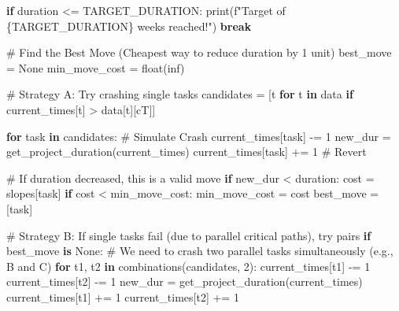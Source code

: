 \documentclass[
  letterpaper,
  DIV=11,
  numbers=noendperiod]{scrreprt}
\newenvironment{Shaded}{\begin{snugshade}}{\end{snugshade}}
\newcommand{\BuiltInTok}[1]{\textcolor[rgb]{0.00,0.23,0.31}{#1}}
\newcommand{\CommentTok}[1]{\textcolor[rgb]{0.37,0.37,0.37}{#1}}
\newcommand{\ControlFlowTok}[1]{\textcolor[rgb]{0.00,0.23,0.31}{\textbf{#1}}}
\newcommand{\DecValTok}[1]{\textcolor[rgb]{0.68,0.00,0.00}{#1}}
\newcommand{\KeywordTok}[1]{\textcolor[rgb]{0.00,0.23,0.31}{\textbf{#1}}}
\newcommand{\NormalTok}[1]{\textcolor[rgb]{0.00,0.23,0.31}{#1}}
\newcommand{\OperatorTok}[1]{\textcolor[rgb]{0.37,0.37,0.37}{#1}}
\newcommand{\SpecialCharTok}[1]{\textcolor[rgb]{0.37,0.37,0.37}{#1}}
\newcommand{\SpecialStringTok}[1]{\textcolor[rgb]{0.13,0.47,0.30}{#1}}
\newcommand{\StringTok}[1]{\textcolor[rgb]{0.13,0.47,0.30}{#1}}
\newcommand{\VariableTok}[1]{\textcolor[rgb]{0.07,0.07,0.07}{#1}}
\begin{document}
\begin{Shaded}
\begin{Highlighting}[]
    \ControlFlowTok{if}\NormalTok{ duration }\OperatorTok{\textless{}=}\NormalTok{ TARGET\_DURATION:}
        \BuiltInTok{print}\NormalTok{(}\SpecialStringTok{f"Target of }\SpecialCharTok{\{}\NormalTok{TARGET\_DURATION}\SpecialCharTok{\}}\SpecialStringTok{ weeks reached!"}\NormalTok{)}
        \ControlFlowTok{break}

    \CommentTok{\# Find the Best Move (Cheapest way to reduce duration by 1 unit)}
\NormalTok{    best\_move }\OperatorTok{=} \VariableTok{None}
\NormalTok{    min\_move\_cost }\OperatorTok{=} \BuiltInTok{float}\NormalTok{(}\StringTok{\textquotesingle{}inf\textquotesingle{}}\NormalTok{)}
    
    \CommentTok{\# Strategy A: Try crashing single tasks}
\NormalTok{    candidates }\OperatorTok{=}\NormalTok{ [t }\ControlFlowTok{for}\NormalTok{ t }\KeywordTok{in}\NormalTok{ data }\ControlFlowTok{if}\NormalTok{ current\_times[t] }\OperatorTok{\textgreater{}}\NormalTok{ data[t][}\StringTok{\textquotesingle{}cT\textquotesingle{}}\NormalTok{]]}
    
    \ControlFlowTok{for}\NormalTok{ task }\KeywordTok{in}\NormalTok{ candidates:}
        \CommentTok{\# Simulate Crash}
\NormalTok{        current\_times[task] }\OperatorTok{{-}=} \DecValTok{1}
\NormalTok{        new\_dur }\OperatorTok{=}\NormalTok{ get\_project\_duration(current\_times)}
\NormalTok{        current\_times[task] }\OperatorTok{+=} \DecValTok{1} \CommentTok{\# Revert}
        
        \CommentTok{\# If duration decreased, this is a valid move}
        \ControlFlowTok{if}\NormalTok{ new\_dur }\OperatorTok{\textless{}}\NormalTok{ duration:}
\NormalTok{            cost }\OperatorTok{=}\NormalTok{ slopes[task]}
            \ControlFlowTok{if}\NormalTok{ cost }\OperatorTok{\textless{}}\NormalTok{ min\_move\_cost:}
\NormalTok{                min\_move\_cost }\OperatorTok{=}\NormalTok{ cost}
\NormalTok{                best\_move }\OperatorTok{=}\NormalTok{ [task]}

    \CommentTok{\# Strategy B: If single tasks fail (due to parallel critical paths), try pairs}
    \ControlFlowTok{if}\NormalTok{ best\_move }\KeywordTok{is} \VariableTok{None}\NormalTok{:}
        \CommentTok{\# We need to crash two parallel tasks simultaneously (e.g., B and C)}
        \ControlFlowTok{for}\NormalTok{ t1, t2 }\KeywordTok{in}\NormalTok{ combinations(candidates, }\DecValTok{2}\NormalTok{):}
\NormalTok{            current\_times[t1] }\OperatorTok{{-}=} \DecValTok{1}
\NormalTok{            current\_times[t2] }\OperatorTok{{-}=} \DecValTok{1}
\NormalTok{            new\_dur }\OperatorTok{=}\NormalTok{ get\_project\_duration(current\_times)}
\NormalTok{            current\_times[t1] }\OperatorTok{+=} \DecValTok{1}
\NormalTok{            current\_times[t2] }\OperatorTok{+=} \DecValTok{1}
            

\end{Highlighting}
\end{Shaded}
\end{document}

